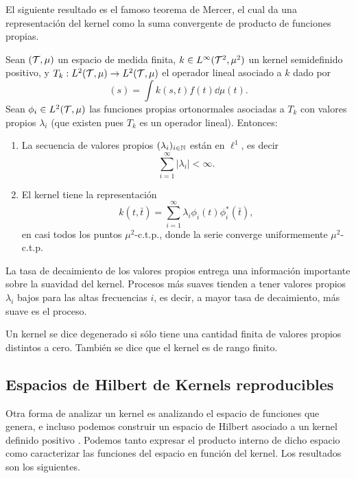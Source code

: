 El siguiente resultado es el famoso teorema de Mercer, el cual da una representación del kernel como la suma convergente de producto de funciones propias.

\begin{theorem}[Mercer]
	Sean \((\mathcal{T}, \mu)\) un espacio de medida finita, \(k \in L^{\infty}(\mathcal{T}^{2}, \mu^{2})\) un kernel semidefinido positivo, y \(T_{k} : L^{2}(\mathcal{T}, \mu) \to L^{2}(\mathcal{T}, \mu)\) el operador lineal asociado a \(k\) dado por
	\begin{equation*}
		[T_{k}(f)](s) = \int k(s, t) f(t) \dd{\mu(t)}.
	\end{equation*}
	Sean \(\phi_{i} \in L^{2}(\mathcal{T}, \mu)\) las funciones propias ortonormales asociadas a \(T_{k}\) con valores propios \(\lambda_{i}\) (que existen pues \(T_k\) es un operador lineal). Entonces:
	
	\begin{enumerate}
		\item La secuencia de valores propios \((\lambda_{i})_{i \in \mathbb{N}}\) están en \(\ell^{1}\), es decir
		\[\sum_{i=1}^{\infty} \left\vert \lambda_{i} \right\vert < \infty.\]
		\item El kernel tiene la representación
		\[ k(t, \bar{t}) = \sum_{i=1}^{\infty} \lambda_{i} \phi_{i}(t) \phi_{i}^{\ast}(\bar{t}),\]
		en casi todos los puntos \(\mu^{2}\)-c.t.p., donde la serie converge uniformemente \(\mu^{2}\)-c.t.p.
	\end{enumerate}
\end{theorem}

La tasa de decaimiento de los valores propios entrega una información importante sobre la suavidad del kernel. Procesos más suaves tienden a tener valores propios \(\lambda_{i}\) bajos para las altas frecuencias \(i\), es decir, a mayor tasa de decaimiento, más suave es el proceso.


\begin{definition}
	Un kernel se dice degenerado si sólo tiene una cantidad finita de valores propios distintos a cero. También se dice que el kernel es de rango finito.
\end{definition}


\subsection{Espacios de Hilbert de Kernels reproducibles}

Otra forma de analizar un kernel es analizando el espacio de funciones que genera, e incluso podemos construir un espacio de Hilbert asociado a un kernel definido positivo \cite{steinwart2006explicit}. Podemos tanto expresar el producto interno de dicho espacio como caracterizar las funciones del espacio en función del kernel. Los resultados son los siguientes.

